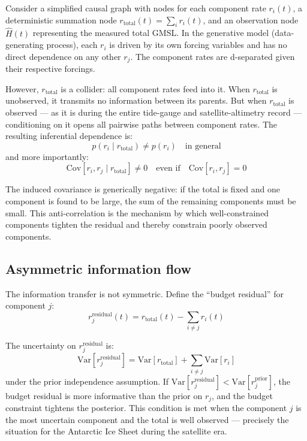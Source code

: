 \documentclass[11pt]{article}
\begin{document}
Consider a simplified causal graph with nodes for each component rate $r_i(t)$, a deterministic summation node $r_{\text{total}}(t) = \sum_i r_i(t)$, and an observation node $\hat{H}(t)$ representing the measured total GMSL.  In the generative model (data-generating process), each $r_i$ is driven by its own forcing variables and has no direct dependence on any other $r_j$.  The component rates are d-separated given their respective forcings.

However, $r_{\text{total}}$ is a collider: all component rates feed into it.  When $r_{\text{total}}$ is unobserved, it transmits no information between its parents.  But when $r_{\text{total}}$ is observed --- as it is during the entire tide-gauge and satellite-altimetry record --- conditioning on it opens all pairwise paths between component rates.  The resulting inferential dependence is:
\begin{equation}
  p(r_i \mid r_{\text{total}}) \neq p(r_i) \quad \text{in general}
  \label{eq:collider}
\end{equation}
and more importantly:
\begin{equation}
  \text{Cov}[r_i, r_j \mid r_{\text{total}}] \neq 0 \quad \text{even if} \quad \text{Cov}[r_i, r_j] = 0
  \label{eq:induced-cov}
\end{equation}

The induced covariance is generically negative: if the total is fixed and one component is found to be large, the sum of the remaining components must be small.  This anti-correlation is the mechanism by which well-constrained components tighten the residual and thereby constrain poorly observed components.

\subsection{Asymmetric information flow}

The information transfer is not symmetric.  Define the ``budget residual'' for component $j$:
\begin{equation}
  r_j^{\text{residual}}(t) = r_{\text{total}}(t) - \sum_{i \neq j} r_i(t)
  \label{eq:residual}
\end{equation}

The uncertainty on $r_j^{\text{residual}}$ is:
\begin{equation}
  \text{Var}[r_j^{\text{residual}}] = \text{Var}[r_{\text{total}}] + \sum_{i \neq j} \text{Var}[r_i]
  \label{eq:residual-var}
\end{equation}
under the prior independence assumption.  If $\text{Var}[r_j^{\text{residual}}] < \text{Var}[r_j^{\text{prior}}]$, the budget residual is more informative than the prior on $r_j$, and the budget constraint tightens the posterior.  This condition is met when the component $j$ is the most uncertain component and the total is well observed --- precisely the situation for the Antarctic Ice Sheet during the satellite era.
\end{document}
